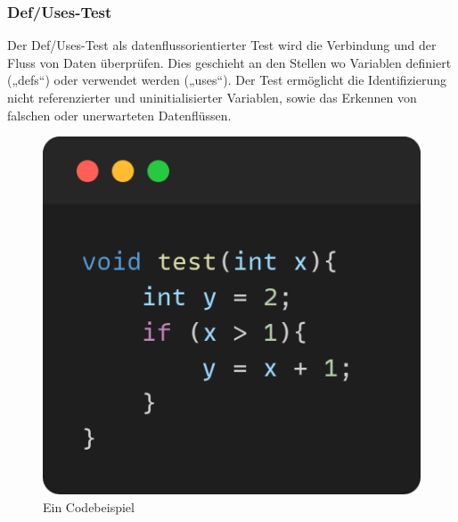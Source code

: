 \documentclass[	%
		fontsize=11pt,  %
		a4paper,	    %
		ngerman,		%
		sans,			%
		f4,				%
	]{HsH-report}		%
\begin{document}
\subsubsection{Def/Uses-Test}
Der Def/Uses-Test als datenflussorientierter Test wird die Verbindung und der
Fluss von Daten überprüfen. Dies geschieht an den Stellen wo Variablen
definiert („defs“) oder verwendet werden („uses“). Der Test ermöglicht die
Identifizierung nicht referenzierter und uninitialisierter Variablen, sowie das
Erkennen von falschen oder unerwarteten Datenflüssen.
\cite{liggesmeyer:qualitaet}

\begin{figure}
	\centering
	\begin{minipage}{0.49\textwidth}
		\centering
		\includegraphics[width=1\textwidth]{test_Bsp.png}
		\caption{Ein Codebeispiel}
	\end{minipage}\hfill
	\begin{minipage}{0.49\textwidth}
		\centering

\end{minipage}
\end{figure}
\end{document}
